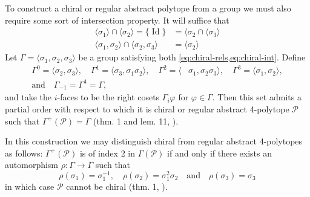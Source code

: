 \documentclass{article}
\theoremstyle{definition}
\newcommand{\p}{\mathcal{P}}
\DeclareMathOperator{\Id}{Id}
\begin{document}
	To construct a chiral or regular abstract polytope from a group we must also require some sort of intersection property. It will suffice that
	\begin{equation}\label{eq:chiral-int}
		\begin{aligned}
			\langle\sigma_1\rangle\cap\langle\sigma_2\rangle=\{\Id\}&=\langle\sigma_2\cap\langle\sigma_3\rangle\\
			\langle\sigma_1,\sigma_2\rangle\cap\langle\sigma_2,\sigma_3\rangle&=\langle\sigma_2\rangle
		\end{aligned}
	\end{equation}
	Let $\Gamma=\langle \sigma_1,\sigma_2,\sigma_3\rangle$ be a group satisfying both \cref{eq:chiral-rels,eq:chiral-int}. Define
	\begin{align*}
		\Gamma^0=\langle\sigma_2,\sigma_3\rangle,\quad
		\Gamma^1=\langle \sigma_3,\sigma_1\sigma_2\rangle,\quad
		\Gamma^2=\langle &\sigma_1,\sigma_2\sigma_3\rangle,\quad
		\Gamma^3=\langle \sigma_1,\sigma_2\rangle,\\
		\text{and}\quad\Gamma_{-1}=\Gamma^4=\Gamma,
	\end{align*}
	and take the $i$-faces to be the right cosets $\Gamma_i\varphi$ for $\varphi\in\Gamma$. Then this set admits a partial order with respect to which it is chiral or regular abstract 4-polytope $\p$ such that $\Gamma^+(\p)=\Gamma$ (thm. 1 and lem. 11, \cite{schulte-chiral}).
	
	In this construction we may distinguish chiral from regular abstract 4-polytopes as follows: $\Gamma^+(\p)$ is of index 2 in $\Gamma(\p)$ if and only if there exists an automorphism $\rho:\Gamma\to \Gamma$ such that
	\begin{equation}\label{eq:combinatorially-chiral}
		\rho(\sigma_1)=\sigma_1^{-1},\quad \rho(\sigma_2)=\sigma_1^2\sigma_2\quad\text{and}\quad \rho(\sigma_3)=\sigma_3
\end{equation}
	in which case $\p$ cannot be chiral (thm. 1, \cite{schulte-chiral}).
	
\iffalse%
\end{document}
